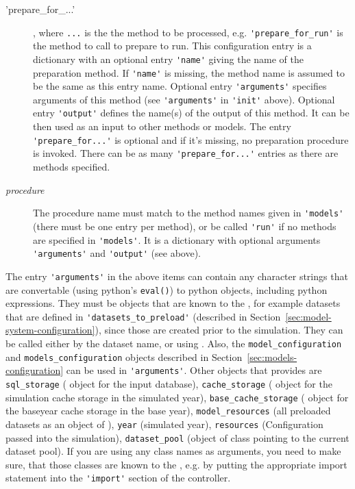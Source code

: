 \begin{description}
\item['prepare_for_...'], where \verb|...| is the the method
to be processed, e.g. \verb|'prepare_for_run'| is the method to call to prepare
to run. This configuration entry is a dictionary with an
optional entry \verb|'name'| giving the name of the preparation method. If \verb|'name'| is
missing, the method name is assumed to be the same as this entry name. Optional
entry \verb|'arguments'| specifies arguments of this method (see \verb|'arguments'| in \verb|'init'|
above). Optional entry \verb|'output'| defines the name(s) of the output of this
method.  It can be then used as an input to other methods or models. The entry
\verb|'prepare_for...'| is optional and if it's missing, no preparation procedure is
invoked. There can be as many \verb|'prepare_for...'| entries as there are
methods specified.
\item[{\it procedure}] The procedure name must match to the method names given
in \verb|'models'| (there must be one entry per method), or be called \verb|'run'| if no
methods are specified in \verb|'models'|. It is a dictionary with optional arguments
\verb|'arguments'| and \verb|'output'| (see above).
\end{description}

The entry \verb|'arguments'| in the above items can contain any character
strings that are convertable (using python's \verb|eval()|) to python objects,
including python expressions. They must be objects that are known to the
, for example datasets that are defined in
\verb|'datasets_to_preload'| (described in
Section~\ref{sec:model-system-configuration}), since those are created prior to
the simulation. They can be called either by the dataset name, or using
. Also, the \verb|model_configuration| and
\verb|models_configuration| objects described in
Section~\ref{sec:models-configuration} can be used in \verb|'arguments'|. Other
objects that  provides are \verb|sql_storage|
( object for the input database), \verb|cache_storage|
( object for the simulation cache \simulationcacheindex storage
in the simulated year), \verb|base_cache_storage| ( object for
the baseyear cache storage in the base year),
\verb|model_resources| (all preloaded datasets as an object of
), \verb|year| (simulated year), \verb|resources|
(Configuration passed into the simulation), \verb|dataset_pool| (object of class  pointing to the current
dataset pool).  If you are using any class names
as arguments, you need to make sure, that those classes are known to the
, e.g. by putting the appropriate import statement into the
\verb|'import'| section of the controller.

